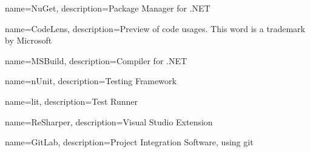 {
	name=NuGet,
	description={Package Manager for .NET}
}

{
	name=CodeLens,
	description={Preview of code usages. This word is a trademark by Microsoft}
}

{
	name=MSBuild,
	description={Compiler for .NET}
}

{
	name=nUnit,
	description={Testing Framework}
}

{
	name=lit,
	description={Test Runner}
}

{
	name=ReSharper,
	description={Visual Studio Extension}
}

{
	name=GitLab,
	description={Project Integration Software, using git}
}
